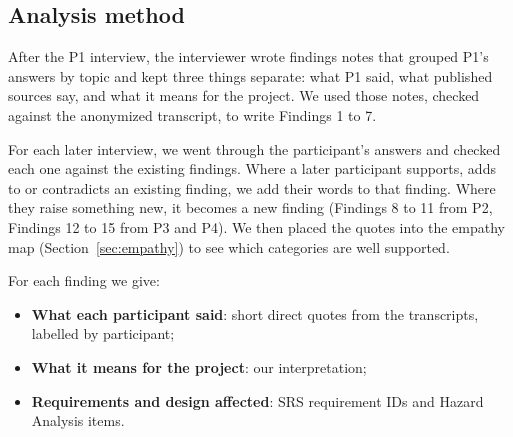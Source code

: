 \documentclass[12pt, titlepage]{article}
\begin{document}
\subsection{Analysis method}\label{sec:analysismethod}

After the P1 interview, the interviewer wrote findings notes that grouped P1's answers by topic and kept three things separate: what P1 said, what published sources say, and what it means for the project. We used those notes, checked against the anonymized transcript, to write Findings 1 to 7.

For each later interview, we went through the participant's answers and checked each one against the existing findings. Where a later participant supports, adds to or contradicts an existing finding, we add their words to that finding. Where they raise something new, it becomes a new finding (Findings 8 to 11 from P2, Findings 12 to 15 from P3 and P4). We then placed the quotes into the empathy map (Section~\ref{sec:empathy}) to see which categories are well supported.

For each finding we give:
\begin{itemize}
    \item \textbf{What each participant said}: short direct quotes from the transcripts, labelled by participant;
    \item \textbf{What it means for the project}: our interpretation;
    \item \textbf{Requirements and design affected}: SRS requirement IDs and Hazard Analysis items.
\end{itemize}
\end{document}
